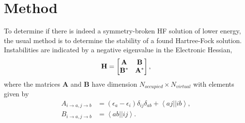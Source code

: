 \documentclass[preprint, journal=prl]{revtex4-1}
\begin{document}
    
    
\section{Method}

  
  To determine if there is indeed a symmetry-broken HF solution of lower energy, the usual method  is to determine the stability of a found Hartree-Fock solution. Instabilities are indicated by a negative eigenvalue in the Electronic Hessian, 
  \begin{equation}
    \bf{H}=
    \begin{bmatrix}
      \bf{A} &\bf{B} \\
      \bf{B}^* & \bf{A}^* \\
    \end{bmatrix},
  \end{equation} 
  where the matrices $\mathbf{A}$ and $\mathbf{B}$ have dimension $N_{occupied} \times N_{virtual}$ with elements given by
  \begin{align}
     A_{i \rightarrow a, j \rightarrow b} &= (\epsilon_a-\epsilon_i)\delta_{ij}\delta_{ab} 
     + \left< aj||ib \right>, \\
     B_{i \rightarrow a, j \rightarrow b} &= \left< ab||ij \right>. 
  \end{align}    
  
\end{document}

